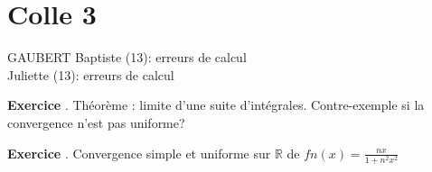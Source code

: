 \documentclass[10pt,a4paper]{article}
\newcounter{question}
\newcounter{exo}
\newenvironment{exo}{\vspace{0.5cm}\setcounter{question}{0}\addtocounter{exo}{1} \noindent \textbf{Exercice \theexo}. \normalsize }{\par}
\begin{document}
	\section*{Colle 3}
	\setcounter{exo}{0}
	GAUBERT Baptiste (13): erreurs de calcul\\
	Juliette (13): erreurs de calcul\\
	
	\begin{exo}
		Théorème : limite d'une suite d'intégrales. Contre-exemple si la convergence n'est pas uniforme?
	\end{exo}
	
	\begin{exo}
		Convergence simple et uniforme sur $\mathbb{R}$ de $fn(x) = \frac{nx}{1+n^2 x^2}$
	\end{exo}
\end{document}
